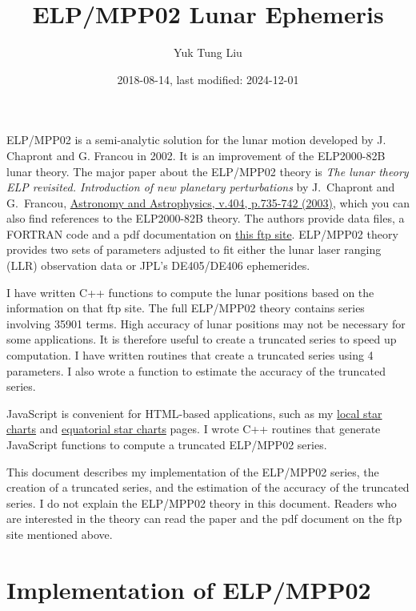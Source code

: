 \documentclass[12pt]{article}
\begin{document}
\title{ELP/MPP02 Lunar Ephemeris}
\author{Yuk Tung Liu}
\date{2018-08-14, last modified: 2024-12-01}
\maketitle

ELP/MPP02 is a semi-analytic solution for the lunar motion developed by 
J. Chapront and G. Francou in 2002. It is an improvement of the ELP2000-82B 
lunar theory. The major paper about the ELP/MPP02 theory is 
{\it The lunar theory ELP revisited. 
Introduction of new planetary perturbations} by J.\ Chapront and G.\ Francou, 
\href{https://ui.adsabs.harvard.edu/abs/2003A%26A...404..735C/abstract}{Astronomy and Astrophysics, 
v.404, p.735-742 (2003)}, which you can also find references to the ELP2000-82B 
theory. The authors provide data files, a FORTRAN code and a 
pdf documentation on \href{ftp://cyrano-se.obspm.fr/pub/2_lunar_solutions/2_elpmpp02/}{this 
ftp site}. ELP/MPP02 theory provides two sets of parameters adjusted to fit 
either the lunar laser ranging (LLR) observation data or JPL's DE405/DE406 
ephemerides.

I have written C++ functions to compute the lunar positions based on  
the information on that ftp site. The full ELP/MPP02 theory contains 
series involving 35901 terms. High accuracy of lunar positions 
may not be necessary for some applications. It is therefore useful to create 
a truncated series to speed up computation. I have written routines 
that create a truncated series using 4 parameters. I 
also wrote a function to estimate the accuracy of the truncated series. 

JavaScript is convenient for HTML-based applications, such as my
\href{https://ytliu0.github.io/starCharts/}{local star charts} and
\href{https://ytliu0.github.io/starCharts/chartGCRS_min.html}{equatorial star
charts} pages. I wrote C++ routines that generate JavaScript functions to compute a truncated ELP/MPP02 series.

This document describes my implementation of the ELP/MPP02 series, 
the creation of a truncated series, and the estimation of the accuracy 
of the truncated series. I do not explain the ELP/MPP02 theory in this 
document. Readers who are interested in the theory can read the paper and 
the pdf document on the ftp site mentioned above.

\section{Implementation of ELP/MPP02} 
\end{document}

